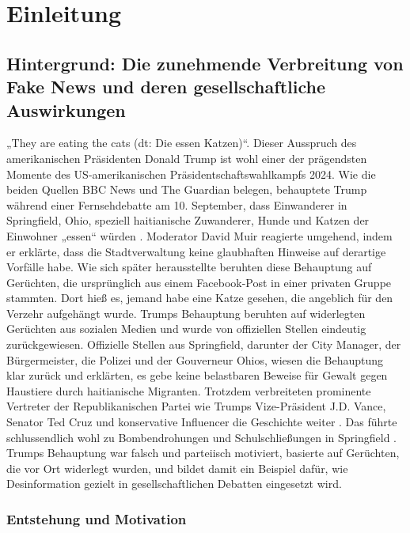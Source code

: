 \chapter{Einleitung}
\label{chap:einleitung}

\section{Hintergrund: Die zunehmende Verbreitung von Fake News und deren gesellschaftliche Auswirkungen}
\label{sec:hintergrund}


„They are eating the cats (dt: Die essen Katzen)“. Dieser Ausspruch des amerikanischen Präsidenten Donald Trump ist wohl einer der prägendsten Momente des 
US-amerikanischen Präsidentschaftswahlkampfs 2024. Wie die beiden Quellen BBC News und The Guardian belegen, behauptete Trump während einer Fernsehdebatte am 10. September, 
dass Einwanderer in Springfield, Ohio, speziell haitianische Zuwanderer, Hunde und Katzen der Einwohner „essen“ würden \cite{guardian2024_trump_springfield_pets, bbc2024_peteating_immigrants}. 
Moderator David Muir reagierte umgehend, indem er erklärte, dass die Stadtverwaltung keine glaubhaften Hinweise auf derartige Vorfälle habe. 
Wie sich später herausstellte beruhten diese Behauptung auf Gerüchten, die ursprünglich aus einem Facebook-Post in einer privaten Gruppe stammten. 
Dort hieß es, jemand habe eine Katze gesehen, die angeblich für den Verzehr aufgehängt wurde. Trumps Behauptung beruhten auf widerlegten Gerüchten aus sozialen Medien und 
wurde von offiziellen Stellen eindeutig zurückgewiesen. 
Offizielle Stellen aus Springfield, darunter der City Manager, der Bürgermeister, die Polizei und der Gouverneur Ohios, wiesen die Behauptung klar zurück und erklärten, 
es gebe keine belastbaren Beweise für Gewalt gegen Haustiere durch haitianische Migranten. Trotzdem verbreiteten prominente Vertreter der 
Republikanischen Partei wie Trumps Vize-Präsident J.D. Vance, Senator Ted Cruz und konservative Influencer die Geschichte weiter \cite{npr2024_vance_springfield_pets}. 
Das führte schlussendlich wohl zu Bombendrohungen und Schulschließungen in Springfield \cite{independent2024_springfield_bombthreats}. 
Trumps Behauptung war falsch und parteiisch motiviert, basierte auf Gerüchten, die vor Ort widerlegt wurden, und bildet damit ein Beispiel dafür, 
wie Desinformation gezielt in gesellschaftlichen Debatten eingesetzt wird.

\subsection{Entstehung und Motivation}


